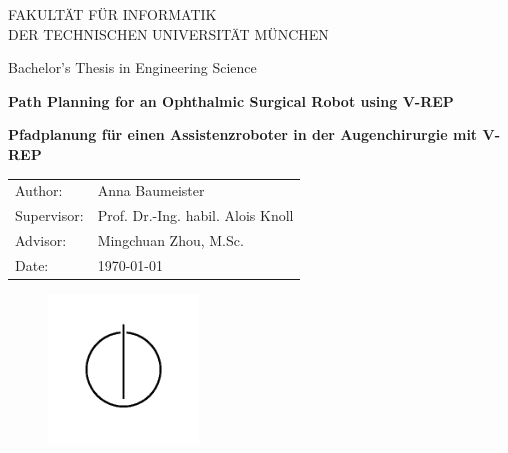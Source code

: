 



\thispagestyle{empty}

\vspace{7mm}
\begin{center}
  \oTUM{4cm}

  \vspace{5mm}
  \huge FAKULT{\"A}T F{\"U}R INFORMATIK\\
  \vspace{0.5cm}
  \large DER TECHNISCHEN UNIVERSIT{\"A}T M{\"U}NCHEN
\end{center}
\vspace{7mm}
\begin{center}

  {\Large Bachelor's Thesis in Engineering Science}

  \vspace{7mm}

  {\LARGE \textbf{Path Planning for an Ophthalmic Surgical Robot using V-REP}}\\

  \vspace{5mm}

  {\LARGE  	\textbf{Pfadplanung für einen Assistenzroboter in der Augenchirurgie mit V-REP}}\\

  \vspace{10mm}

  \begin{tabular}{ll}
    \Large Author:     & \Large Anna Baumeister \\[2mm]
    \Large Supervisor:    & \Large Prof. Dr.-Ing. habil. Alois Knoll\\[2mm]
    \Large Advisor:	& \Large Mingchuan Zhou, M.Sc.\\[2mm]
    \Large Date:       & \Large \today
  \end{tabular}

  \vspace{5mm}

   \begin{figure}[h!]
     \centering
     \includegraphics[width=4cm]{styles/informat.png}
   \end{figure}

  \vspace{10mm}

\end{center}

